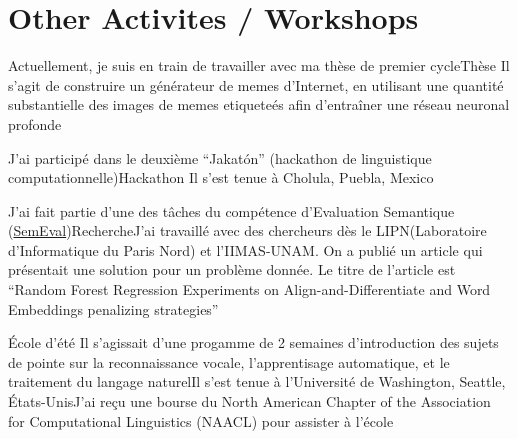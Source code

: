 \documentclass[11pt,a4paper,sans]{moderncv} %
\begin{document}
\section{Other Activites / Workshops}


        {Actuellement, je suis en train de travailler avec ma thèse de premier cycle}{Thèse}
        {Il s'agit de construire un générateur de memes d'Internet, en utilisant une quantité substantielle des images de memes etiqueteés afin d'entraîner une réseau neuronal profonde}
        {}{}

        {J'ai participé dans le deuxième ``Jakatón'' (hackathon de linguistique computationnelle)}{Hackathon}
        {Il s'est tenue à Cholula, Puebla, Mexico}{}{}

        {J'ai fait partie d'une des tâches du compétence d'Evaluation Semantique (\href{http://alt.qcri.org/semeval2016/}{SemEval})}{Recherche}{J'ai travaillé avec des chercheurs dès le LIPN(Laboratoire d'Informatique du Paris Nord) et l'IIMAS-UNAM. On a publié un article qui présentait une solution pour un problème donnée.}
        {Le titre de l'article est ``Random Forest Regression Experiments on Align-and-Differentiate and Word Embeddings penalizing strategies''}
        {}

        {École d'été}
        {Il s'agissait d'une progamme de 2 semaines d'introduction des sujets de pointe sur la reconnaissance vocale, l'apprentisage automatique, et le traitement du langage naturel}{Il s'est tenue à l'Université de Washington, Seattle, États-Unis}{J'ai reçu une bourse du North American Chapter of the Association for Computational Linguistics (NAACL) pour assister à l'école}

\end{document}
